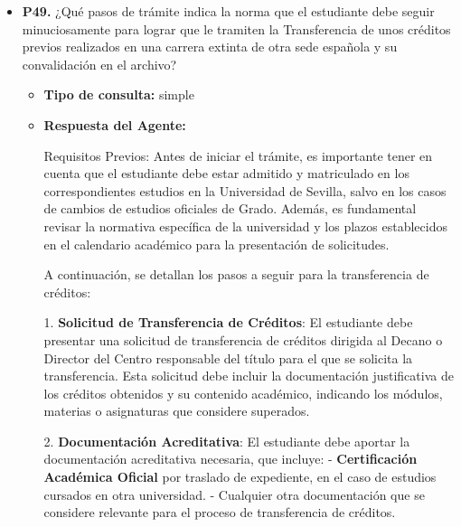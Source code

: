 \documentclass{article}
\begin{document}
\begin{itemize}
\begin{itemize}
                        Es importante tener en cuenta que cada entrada de Registro debe corresponder a una sola solicitud de abono, y que la documentación debe estar completa y correcta para evitar retrasos en el proceso.
                  \item \textbf{Contexto utilizado:}

            \end{itemize}

      \item \textbf{P49.} ¿Qué pasos de trámite indica la norma que el estudiante debe seguir minuciosamente para lograr que le tramiten la Transferencia de unos créditos previos realizados en una carrera extinta de otra sede española y su convalidación en el archivo? \\
            \begin{itemize}
                  \item \textbf{Tipo de consulta:} simple
                  \item \textbf{Respuesta del Agente:}

                        Requisitos Previos:
                        Antes de iniciar el trámite, es importante tener en cuenta que el estudiante debe estar admitido y matriculado en los correspondientes estudios en la Universidad de Sevilla, salvo en los casos de cambios de estudios oficiales de Grado. Además, es fundamental revisar la normativa específica de la universidad y los plazos establecidos en el calendario académico para la presentación de solicitudes.

                        A continuación, se detallan los pasos a seguir para la transferencia de créditos:

                        1. \textbf{Solicitud de Transferencia de Créditos}: El estudiante debe presentar una solicitud de transferencia de créditos dirigida al Decano o Director del Centro responsable del título para el que se solicita la transferencia. Esta solicitud debe incluir la documentación justificativa de los créditos obtenidos y su contenido académico, indicando los módulos, materias o asignaturas que considere superados.

                        2. \textbf{Documentación Acreditativa}: El estudiante debe aportar la documentación acreditativa necesaria, que incluye:
                        - \textbf{Certificación Académica Oficial} por traslado de expediente, en el caso de estudios cursados en otra universidad.
                        - Cualquier otra documentación que se considere relevante para el proceso de transferencia de créditos.


\end{itemize}
\end{itemize}
\end{document}
